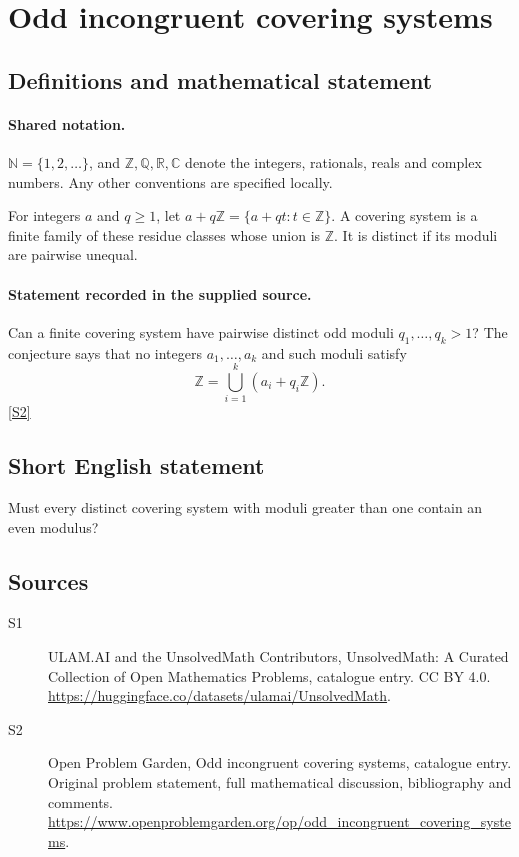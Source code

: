 \documentclass[11pt]{article}
\newcommand{\sref}[2]{\hyperlink{source:#1:#2}{[S#2]}}
\begin{document}
\section{Odd incongruent covering systems}\label{statement}

\subsection{Definitions and mathematical statement}

\paragraph{Shared notation.}$\mathbb N=\{1,2,\ldots\}$, and $\mathbb Z,\mathbb Q,\mathbb R,\mathbb C$ denote the integers, rationals, reals and complex numbers. Any other conventions are specified locally.


For integers $a$ and $q\ge1$, let $a+q\mathbb Z=\{a+qt:t\in\mathbb Z\}$. A covering system is a finite family of these residue classes whose union is $\mathbb Z$. It is distinct if its moduli are pairwise unequal.
\paragraph{Statement recorded in the supplied source.}
Can a finite covering system have pairwise distinct odd moduli $q_1,\ldots,q_k>1$? The conjecture says that no integers $a_1,\ldots,a_k$ and such moduli satisfy
\[
 \mathbb Z=\bigcup_{i=1}^k(a_i+q_i\mathbb Z).
\] \sref{statement}{2}
\subsection{Short English statement}
Must every distinct covering system with moduli greater than one contain an even modulus?
\subsection{Sources}
\begin{description}
\item[\hypertarget{source:statement:1}{S1}] ULAM.AI and the UnsolvedMath Contributors, UnsolvedMath: A Curated Collection of Open Mathematics Problems, catalogue entry. CC BY 4.0. \url{https://huggingface.co/datasets/ulamai/UnsolvedMath}.
\item[\hypertarget{source:statement:2}{S2}] Open Problem Garden, Odd incongruent covering systems, catalogue entry. Original problem statement, full mathematical discussion, bibliography and comments. \url{https://www.openproblemgarden.org/op/odd_incongruent_covering_systems}.
\end{description}
\label{end:statement}
\end{document}
